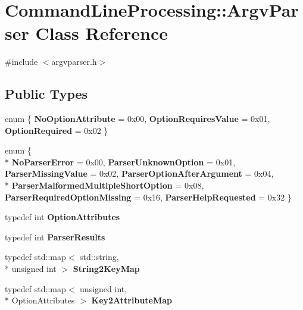 \hypertarget{class_command_line_processing_1_1_argv_parser}{\section{Command\-Line\-Processing\-:\-:Argv\-Parser Class Reference}
\label{class_command_line_processing_1_1_argv_parser}
}


{\ttfamily \#include $<$argvparser.\-h$>$}

\subsection*{Public Types}
\begin{DoxyCompactItemize}
\item 
enum \{ {\bfseries No\-Option\-Attribute} = 0x00, 
{\bfseries Option\-Requires\-Value} = 0x01, 
{\bfseries Option\-Required} = 0x02
 \}
\item 
enum \{ \\*
{\bfseries No\-Parser\-Error} = 0x00, 
{\bfseries Parser\-Unknown\-Option} = 0x01, 
{\bfseries Parser\-Missing\-Value} = 0x02, 
{\bfseries Parser\-Option\-After\-Argument} = 0x04, 
\\*
{\bfseries Parser\-Malformed\-Multiple\-Short\-Option} = 0x08, 
{\bfseries Parser\-Required\-Option\-Missing} = 0x16, 
{\bfseries Parser\-Help\-Requested} = 0x32
 \}
\item 
\hypertarget{class_command_line_processing_1_1_argv_parser_a09e98f88e306ec9a2fb780f05981a857}{typedef int {\bfseries Option\-Attributes}}\label{class_command_line_processing_1_1_argv_parser_a09e98f88e306ec9a2fb780f05981a857}

\item 
\hypertarget{class_command_line_processing_1_1_argv_parser_a2b812f40e18434aa89eb826ff06535ce}{typedef int {\bfseries Parser\-Results}}\label{class_command_line_processing_1_1_argv_parser_a2b812f40e18434aa89eb826ff06535ce}

\item 
\hypertarget{class_command_line_processing_1_1_argv_parser_a2c9d8a1f76332abcee2cf7a81cc03fb7}{typedef std\-::map$<$ std\-::string, \\*
unsigned int $>$ {\bfseries String2\-Key\-Map}}\label{class_command_line_processing_1_1_argv_parser_a2c9d8a1f76332abcee2cf7a81cc03fb7}

\item 
\hypertarget{class_command_line_processing_1_1_argv_parser_aa7a92cef773f3c498d09221598400f03}{typedef std\-::map$<$ unsigned int, \\*
Option\-Attributes $>$ {\bfseries Key2\-Attribute\-Map}}\label{class_command_line_processing_1_1_argv_parser_aa7a92cef773f3c498d09221598400f03}


\end{DoxyCompactItemize}
